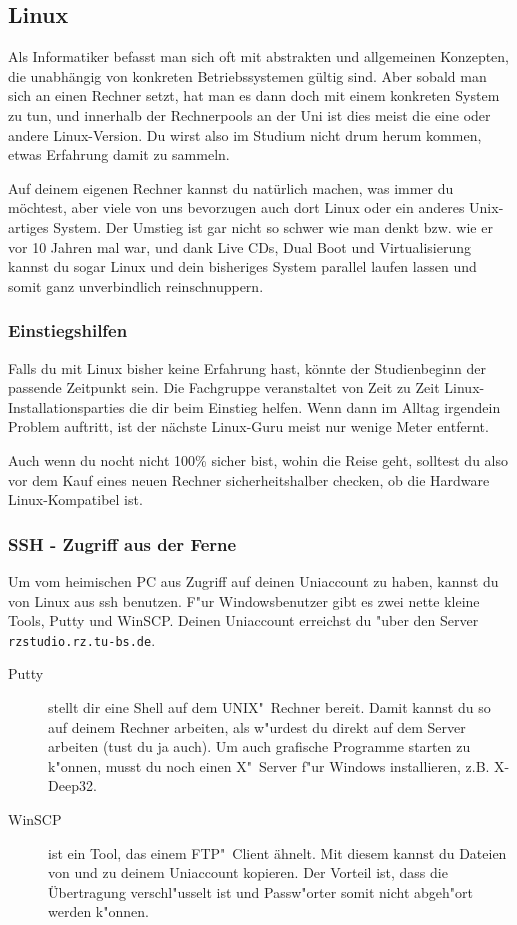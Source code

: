 \begin{multicols}{2}
\subsection{Linux}
	\label{linux}
	Als Informatiker befasst man sich oft mit abstrakten und allgemeinen Konzepten, die unabhängig von konkreten Betriebssystemen gültig sind. Aber sobald man sich an einen Rechner setzt, hat man es dann doch mit einem konkreten System zu tun, und innerhalb der Rechnerpools an der Uni ist dies meist die eine oder andere Linux-Version. Du wirst also im Studium nicht drum herum kommen, etwas Erfahrung damit zu sammeln.

	Auf deinem eigenen Rechner kannst du natürlich machen, was immer du möchtest, aber viele von uns bevorzugen auch dort Linux oder ein anderes Unix-artiges System. Der Umstieg ist gar nicht so schwer wie man denkt bzw. wie er vor 10 Jahren mal war, und dank Live CDs, Dual Boot und Virtualisierung kannst du sogar Linux und dein bisheriges System parallel laufen lassen und somit ganz unverbindlich reinschnuppern.

	\subsubsection{Einstiegshilfen}
		Falls du mit Linux bisher keine Erfahrung hast, könnte der Studienbeginn der passende Zeitpunkt sein. Die Fachgruppe veranstaltet von Zeit zu Zeit Linux-Installationsparties die dir beim Einstieg helfen. Wenn dann im Alltag irgendein Problem auftritt, ist der nächste Linux-Guru meist nur wenige Meter entfernt.

		Auch wenn du nocht nicht 100\% sicher bist, wohin die Reise geht, solltest du also vor dem Kauf eines neuen Rechner sicherheitshalber checken, ob die Hardware Linux-Kompatibel ist.

	\subsubsection{SSH - Zugriff aus der Ferne}
		Um vom heimischen PC aus Zugriff auf deinen Uniaccount zu haben, kannst du von Linux aus ssh benutzen. F"ur Windowsbenutzer gibt es zwei nette kleine Tools, Putty und WinSCP. Deinen Uniaccount erreichst du "uber den Server \texttt{rzstudio.rz.tu-bs.de}.

		\begin{description}
			\item[Putty] stellt dir eine Shell auf dem UNIX"~Rechner bereit. Damit kannst du so auf deinem Rechner arbeiten, als w"urdest du direkt auf dem Server arbeiten (tust du ja auch). Um auch grafische Programme starten zu k"onnen, musst du noch einen X"~Server f"ur Windows installieren, z.B. X-Deep32.
			\item[WinSCP] ist ein Tool, das einem FTP"~Client ähnelt. Mit diesem kannst du Dateien von und zu deinem Uniaccount kopieren. Der Vorteil ist, dass die Übertragung verschl"usselt ist und Passw"orter somit nicht abgeh"ort werden k"onnen.
		\end{description}


\end{multicols}
